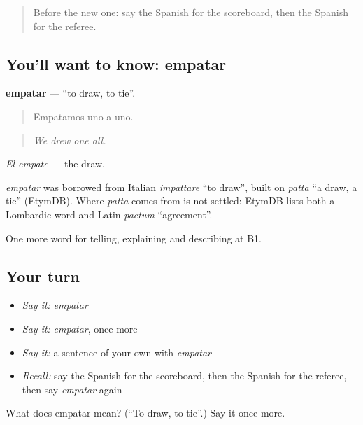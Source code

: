 \begin{quote}
Before the new one: say the Spanish for the scoreboard, then the Spanish for the referee.
\end{quote}

\subsection*{You'll want to know: empatar}
\textbf{empatar} — \textquotedblleft{}to draw, to tie\textquotedblright{}.

\begin{quote}
Empatamos uno a uno.
\end{quote}

\begin{quote}
\emph{We drew one all.}
\end{quote}

\emph{El empate} — the draw.

\begin{cousinweb}
\emph{empatar} was borrowed from Italian \emph{impattare} \textquotedblleft{}to draw\textquotedblright{}, built on \emph{patta} \textquotedblleft{}a draw, a tie\textquotedblright{} (EtymDB). Where \emph{patta} comes from is not settled: EtymDB lists both a Lombardic word and Latin \emph{pactum} \textquotedblleft{}agreement\textquotedblright{}.
\end{cousinweb}

\begin{grammarlens}[title={What you've built}]
One more word for telling, explaining and describing at B1.
\end{grammarlens}

\subsection*{Your turn}
\begin{itemize}
\raggedright
  \item \emph{Say it:} \emph{empatar}
  \item \emph{Say it:} \emph{empatar}, once more
  \item \emph{Say it:} a sentence of your own with \emph{empatar}
  \item \emph{Recall:} say the Spanish for the scoreboard, then the Spanish for the referee, then say \emph{empatar} again
\end{itemize}

\begin{tcolorbox}[breakable,colback=teal!4,colframe=teal!35!black,title={Before you move on}]
What does empatar mean? (\textquotedblleft{}To draw, to tie\textquotedblright{}.) Say it once more.
\end{tcolorbox}
